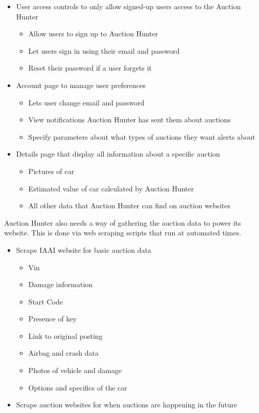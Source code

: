 \documentclass[onecolumn, draftclsnofoot,10pt, compsoc]{IEEEtran}
\begin{document}
\begin{itemize}
\item User access controls to only allow signed-up users access to the Auction Hunter
\begin{itemize}
    \item Allow users to sign up to Auction Hunter
    \item Let users sign in using their email and password
    \item Reset their password if a user forgets it
\end{itemize}
\item Account page to manage user preferences
\begin{itemize}
    \item Lets user change email and password
    \item View notifications Auction Hunter has sent them about auctions
    \item Specify parameters about what types of auctions they want alerts about
\end{itemize}
\item Details page that display all information about a specific auction
\begin{itemize}
    \item Pictures of car
    \item Estimated value of car calculated by Auction Hunter
    \item All other data that Auction Hunter can find on auction websites
\end{itemize}
\end{itemize}

Auction Hunter also needs a way of gathering the auction data to power its website. This is done via web scraping scripts that run at automated times.

\begin{itemize}
    \item Scrape IAAI website for basic auction data
    \begin{itemize}
        \item Vin
        \item Damage information
        \item Start Code
        \item Presence of key
        \item Link to original posting
        \item Airbag and crash data
        \item Photos of vehicle and damage
        \item Options and specifics of the car
    \end{itemize}
    \item Scrape auction websites for when auctions are happening in the future
\end{itemize}
\end{document}
